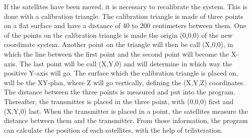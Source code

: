 If the satellites have been moved, it is necessary to recalibrate the system. This is done with a calibration triangle. The calibration triangle is made of three points on a flat surface and have a distance of 40 to 200 centimeters between them. One of the points on the calibration triangle is made the origin (0,0,0) of the new coordinate system. Another point on the triangle will then be call (X,0,0), in which the line between the first point and the second point will become the X-axis. The last point will be call (X,Y,0) and will determine in which way the positive Y-axis will go. The surface which the calibration triangle is placed on, will be the XY-plan, where Z will go vertically, defining the (X,Y,Z) coordinates. The distance between the three points is measured and put into the program. Thereafter, the transmitter is placed in the three point, with (0,0,0) first and (X,Y,0) last. When the transmitter is placed in a point, the satellites measure the distance between them and the transmitter. From those information, the program can calculate the position of each satellites, with the help of trilateration. \\\\

